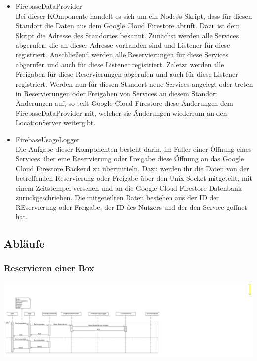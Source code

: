 \documentclass[openright,twoside,a4paper]{scrartcl}
\begin{document}
\begin{itemize}
                        \item FirebaseDataProvider \\
                        Bei dieser KOmponente handelt es sich um ein NodeJs-Skript, dass für diesen Standort die Daten aus dem Google Cloud Firestore abruft.
                        Dazu ist dem Skript die Adresse des Standortes bekannt. Zunächst werden alle Services abgerufen, die an dieser Adresse vorhanden sind und Listener für diese registriert. Anschließend werden alle Reservierungen für diese Services abgerufen und auch für diese Listener registriert. Zuletzt werden alle Freigaben für diese Reservierungen abgerufen und auch für diese Listener registriert. Werden nun für diesen Standort neue Services angelegt oder treten in Reservierungen oder Freigaben von Services an diesem Standort Änderungen auf, so teilt Google Cloud Firestore diese Änderungen dem FirebaseDataProvider mit, welcher sie Änderungen wiederrum an den LocationServer weitergibt.
                        \item FirebaseUsageLogger \\
                        Die Aufgabe dieser Komponenten besteht darin, im Faller einer Öffnung eines Services über eine Reservierung oder Freigabe diese Öffnung an das Google Cloud Firestore Backend zu übermitteln.
                        Dazu werden ihr die Daten von der betreffenden Reservierung oder Freigabe über den Unix-Socket mitgeteilt, mit einem Zeitstempel versehen und an die Google Cloud Firestore Datenbank zurückgeschrieben.
                        Die mitgeteilten Daten bestehen aus der ID der REservierung oder Freigabe, der ID des Nutzers und der den Service göffnet hat.
                    \end{itemize}
            \subsection{Abläufe}
                    \subsubsection{Reservieren einer Box}
                        \includegraphics[scale=0.32]{Bilder/Rent_Sequence_14112019.pdf}
\end{document}
